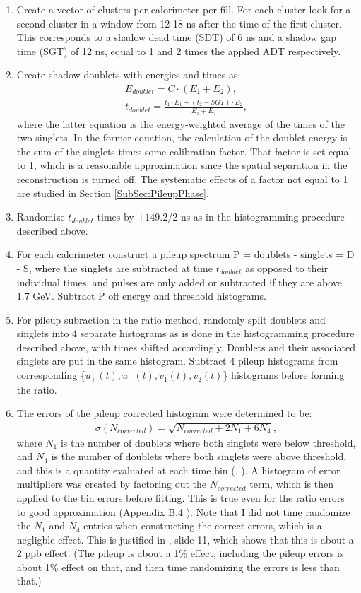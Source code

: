 	\begin{enumerate}
		\item{Create a vector of clusters per calorimeter per fill. For each cluster look for a second cluster in a window from 12-18 ns after the time of the first cluster. This corresponds to a shadow dead time (SDT) of 6 ns and a shadow gap time (SGT) of 12 ns, equal to 1 and 2 times the applied ADT respectively.}
		\item{Create shadow doublets with energies and times as:
			\begin{gather}
				E_{doublet} = C \cdot (E_{1} + E_{2}), \\
				t_{doublet} = \frac{t_{1} \cdot E_{1} + (t_{2}-SGT) \cdot E_{2}}{E_{1} + E_{2}},
			\end{gather}
		where the latter equation is the energy-weighted average of the times of the two singlets. In the former equation, the calculation of the doublet energy is the sum of the singlets times some calibration factor. That factor is set equal to 1, which is a reasonable approximation since the spatial separation in the reconstruction is turned off. The systematic effects of a factor not equal to 1 are studied in Section \ref{SubSec:PileupPhase}.}
		\item{Randomize $t_{doublet}$ times by $\pm 149.2/2$ ns as in the histogramming procedure described above.}
		\item{For each calorimeter construct a pileup spectrum P = doublets - singlets = D - S, where the singlets are subtracted at time $t_{doublet}$ as opposed to their individual times, and pulses are only added or subtracted if they are above 1.7 GeV. Subtract P off energy and threshold histograms.}
		\item{For pileup subraction in the ratio method, randomly split doublets and singlets into 4 separate histograms as is done in the histogramming procedure described above, with times shifted accordingly. Doublets and their associated singlets are put in the same histogram. Subtract 4 pileup histograms from corresponding \{$u_{+}(t), u_{-}(t), v_{1}(t), v_{2}(t)$\} histograms before forming the ratio.}
		\item{The errors of the pileup corrected histogram were determined to be: 
			\begin{gather}
				\sigma(N_{corrected}) = \sqrt{N_{corrected} + 2 N_{1} + 6 N_{4}},
			\end{gather}
		where $N_{1}$ is the number of doublets where both singlets were below threshold, and $N_{4}$ is the number of doublets where both singlets were above threshold, and this is a quantity evaluated at each time bin (, \cite{Pileup2}). A histogram of error multipliers was created by factoring out the $N_{corrected}$ term, which is then applied to the bin errors before fitting. This is true even for the ratio errors to good approximation (Appendix B.4 \cite{JPThesis}). Note that I did not time randomize the $N_{1}$ and $N_{4}$ entries when constructing the correct errors, which is a negligble effect. This is justified in , \cite{Pileup1} slide 11, which shows that this is about a 2 ppb effect. (The pileup is about a 1\% effect, including the pileup errors is about 1\% effect on that, and then time randomizing the errors is less than that.)}

\end{enumerate}
